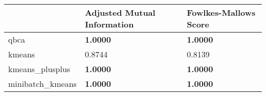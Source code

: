 \begin{table}[htbp]
\centering
\begin{tabular}{lll}
\toprule
 & Adjusted Mutual Information & Fowlkes-Mallows Score \\
\midrule
qbca & \textbf{1.0000} & \textbf{1.0000} \\
kmeans & 0.8744 & 0.8139 \\
kmeans_plusplus & \textbf{1.0000} & \textbf{1.0000} \\
minibatch_kmeans & \textbf{1.0000} & \textbf{1.0000} \\
\bottomrule
\end{tabular}
\end{table}
